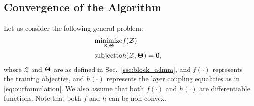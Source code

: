 \subsection{Convergence of the Algorithm}\label{sec:convergence}
Let us consider the following general problem:
\begin{align}\label{eq:main}
	\operatorname*{\rm minimize}_{\mathcal{Z},\bf \Theta} & f(\mathcal{Z})\\
	{\rm subject to} & h(\mathcal{Z},\bm \Theta)=\bm 0,\nonumber
\end{align}
where $\mathcal{Z}$ and $\bf \Theta$ are as defined in Sec.~\ref{sec:block_admm}, and $f(\cdot)$ represents the training objective, and $h(\cdot)$ represents the layer coupling equalities as in \eqref{eq:ourformulation}.
We also assume that both $f(\cdot)$ and $h(\cdot)$ are differentiable functions. Note that both $f$ and $h$ can be non-convex.


